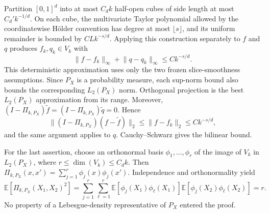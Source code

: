 Partition \([0,1]^d\) into at most \(C_dk\) half-open cubes of side length at most \(C_d'k^{-1/d}\). On each cube, the multivariate Taylor polynomial allowed by the coordinatewise H\"older convention has degree at most \(\lfloor s\rfloor\), and its uniform remainder is bounded by \(CLk^{-s/d}\). Applying this construction separately to \(f\) and \(q\) produces \(f_k,q_k\in V_k\) with
\[
\lVert f-f_k\rVert_\infty+\lVert q-q_k\rVert_\infty\le Ck^{-s/d}.
\]
This deterministic approximation uses only the two frozen slice-smoothness assumptions. Since \(P_X\) is a probability measure, each sup-norm bound also bounds the corresponding \(L_2(P_X)\) norm. Orthogonal projection is the best \(L_2(P_X)\) approximation from its range. Moreover, \((I-\Pi_{k,P_X})\widetilde f=(I-\Pi_{k,P_X})\widetilde q=0\). Hence
\[
\lVert(I-\Pi_{k,P_X})(f-\widetilde f)\rVert_2
\le\lVert f-f_k\rVert_2\le Ck^{-s/d},
\]
and the same argument applies to \(q\). Cauchy--Schwarz gives the bilinear bound.

For the last assertion, choose an orthonormal basis \(\phi_1,\ldots,\phi_r\) of the image of \(V_k\) in \(L_2(P_X)\), where \(r\le\dim(V_k)\le C_dk\). Then \(\Pi_{k,P_X}(x,x')=\sum_{j=1}^r\phi_j(x)\phi_j(x')\). Independence and orthonormality yield
\[
\mathbb E[\Pi_{k,P_X}(X_1,X_2)^2]
=
\sum_{j=1}^r\sum_{\ell=1}^r
\mathbb E[\phi_j(X_1)\phi_\ell(X_1)]
\mathbb E[\phi_j(X_2)\phi_\ell(X_2)]
=r.
\]
No property of a Lebesgue-density representative of \(P_X\) entered the proof.